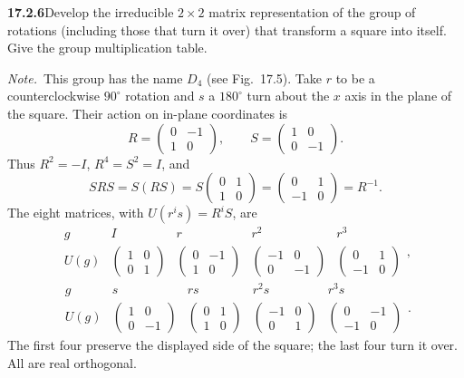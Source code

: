 \par\bigskip
\noindent\textbf{17.2.6}\quad Develop the irreducible $2\times2$
matrix representation of the group of rotations (including those that
turn it over) that transform a square into itself. Give the group
multiplication table.
\par\emph{Note.}~This group has the name $D_{4}$ (see Fig.~17.5).
\solution
Take $r$ to be a counterclockwise $90^\circ$ rotation and $s$ a
$180^\circ$ turn about the $x$ axis in the plane of the square.
Their action on in-plane coordinates is
\[
R=\begin{pmatrix}0&-1\\1&0\end{pmatrix},\qquad
S=\begin{pmatrix}1&0\\0&-1\end{pmatrix}.
\]
Thus $R^2=-I$, $R^4=S^2=I$, and
\[
SRS=S(RS)=S\begin{pmatrix}0&1\\1&0\end{pmatrix}
=\begin{pmatrix}0&1\\-1&0\end{pmatrix}=R^{-1}.
\]
The eight matrices, with $U(r^is)=R^iS$, are
\[
\begin{array}{c|cccc}
g&I&r&r^2&r^3\\\hline
U(g)&
\begin{pmatrix}1&0\\0&1\end{pmatrix}&
\begin{pmatrix}0&-1\\1&0\end{pmatrix}&
\begin{pmatrix}-1&0\\0&-1\end{pmatrix}&
\begin{pmatrix}0&1\\-1&0\end{pmatrix}
\end{array},
\]
\[
\begin{array}{c|cccc}
g&s&rs&r^2s&r^3s\\\hline
U(g)&
\begin{pmatrix}1&0\\0&-1\end{pmatrix}&
\begin{pmatrix}0&1\\1&0\end{pmatrix}&
\begin{pmatrix}-1&0\\0&1\end{pmatrix}&
\begin{pmatrix}0&-1\\-1&0\end{pmatrix}
\end{array}.
\]
The first four preserve the displayed side of the square;
the last four turn it over. All are real orthogonal.

